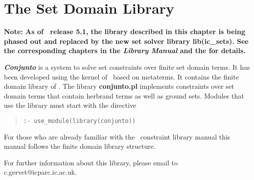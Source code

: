 %
% 
% 
% 
% 

%
%
%
\chapter{ The Set Domain Library}
\label{chapconjunto}

{\bf Note: As of \eclipse\ release 5.1, the library described
in this chapter is being phased out and replaced by the new set solver
library lib(ic\_sets). See the corresponding chapters in the
{\em Library Manual} and the
for details.}
\vspace{3mm}

{\em\bf Conjunto} is a system to solve set constraints over finite set
domain terms. It has been developed using the kernel of \eclipse\ based
on metaterms. It contains the finite domain library of \eclipse.  The
library {\bf conjunto.pl} implements constraints over set domain terms
that contain herbrand terms as well as ground sets. Modules that use
the library must start with the directive
\begin{quote}\begin{verbatim}
:- use_module(library(conjunto))
\end{verbatim}\end{quote}
For those who are already familiar with the \eclipse\ constraint library manual
this manual follows the finite domain library structure.

For further information about this library,
please email to c.gervet@icparc.ic.ac.uk.

